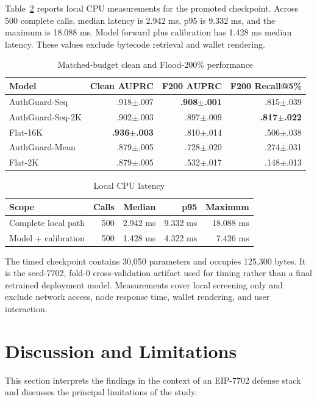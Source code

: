 \documentclass[conference]{IEEEtran}
\begin{document}
Table~\ref{tab:latency} reports local CPU measurements for the promoted checkpoint. Across 500 complete calls, median latency is 2.942 ms, p95 is 9.332 ms, and the maximum is 18.088 ms. Model forward plus calibration has 1.428 ms median latency. These values exclude bytecode retrieval and wallet rendering.




\begin{table}[t]
\centering
\caption{Matched-budget clean and Flood-200\% performance}
\label{tab:robust}
\scriptsize
\begin{tabularx}{\columnwidth}{@{}X r r r@{}}
\toprule
Model & Clean AUPRC & F200 AUPRC & F200 Recall@5\% \\
\midrule
AuthGuard-Seq & .918$\pm$.007 & \textbf{.908$\pm$.001} & .815$\pm$.039 \\
AuthGuard-Seq-2K & .902$\pm$.003 & .897$\pm$.009 & \textbf{.817$\pm$.022} \\
Flat-16K & \textbf{.936$\pm$.003} & .810$\pm$.014 & .506$\pm$.038 \\
AuthGuard-Mean & .879$\pm$.005 & .728$\pm$.020 & .274$\pm$.031 \\
Flat-2K & .879$\pm$.005 & .532$\pm$.017 & .148$\pm$.013 \\
\bottomrule
\end{tabularx}
\end{table}



\begin{table}[t]
\centering
\caption{Local CPU latency}
\label{tab:latency}
\scriptsize
\begin{tabularx}{\columnwidth}{@{}X r r r r@{}}
\toprule
Scope & Calls & Median & p95 & Maximum \\
\midrule
Complete local path & 500 & 2.942 ms & 9.332 ms & 18.088 ms \\
Model + calibration & 500 & 1.428 ms & 4.322 ms & 7.426 ms \\
\bottomrule
\end{tabularx}
\end{table}

The timed checkpoint contains 30,050 parameters and occupies 125,300 bytes. It is the seed-7702, fold-0 cross-validation artifact used for timing rather than a final retrained deployment model. Measurements cover local screening only and exclude network access, node response time, wallet rendering, and user interaction.

\section{Discussion and Limitations}
\label{sec:discussion}
This section interprets the findings in the context of an EIP-7702 defense stack and discusses the principal limitations of the study.
\end{document}
